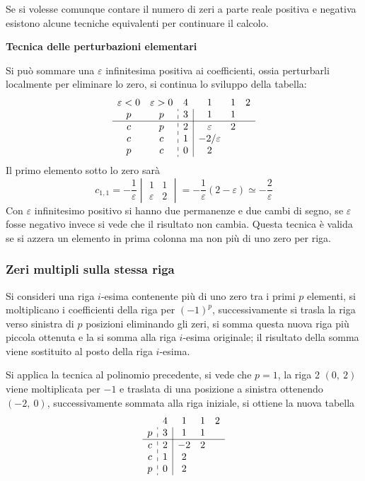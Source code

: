 Se si volesse comunque contare il numero di zeri a parte reale positiva e
negativa esistono alcune tecniche equivalenti per continuare il calcolo.

\textbf{Tecnica delle perturbazioni elementari}

Si può sommare una $\varepsilon$ infinitesima positiva ai coefficienti, ossia
perturbarli localmente per eliminare lo zero, si continua lo sviluppo della
tabella:
$$
\begin{array}{cc:c|cccc}
\varepsilon<0 & \varepsilon>0  & 4 & 1 & 1 & 2 \\
p & p & 3 & 1 & 1 \\ \hline
c & p & 2 & \varepsilon & 2  \\
c & c & 1 & -2/\varepsilon\\
p & c & 0 & 2
\end{array}
$$
Il primo elemento sotto lo zero sarà
$$
c_{1,1} = -\frac{1}{\varepsilon}\begin{vmatrix}
1 & 1 \\
\varepsilon & 2
\end{vmatrix} = -\frac{1}{\varepsilon}(2-\varepsilon) \simeq
-\frac{2}{\varepsilon}
$$
Con $\varepsilon$ infinitesimo positivo si hanno due permanenze e due cambi di
segno, se $\varepsilon$ fosse negativo invece si vede che il risultato non
cambia.
Questa tecnica è valida se si azzera un elemento in prima colonna ma non
più di uno zero per riga.

\newpage
\subsubsection{Zeri multipli sulla stessa riga}
Si consideri una riga $i$-esima contenente più di uno zero tra i primi $p$
elementi, si moltiplicano i coefficienti della riga per $(-1)^p$,
successivamente si trasla la riga verso sinistra di $p$ posizioni eliminando
gli zeri, si somma questa nuova riga più piccola ottenuta e la si somma alla
riga $i$-esima originale; il risultato della somma viene sostituito al posto
della riga $i$-esima.


Si applica la tecnica al polinomio precedente, si vede che $p=1$, la riga 2
$(0,\ 2)$ viene moltiplicata per $-1$ e traslata di una posizione a sinistra
ottenendo $(-2,\ 0)$, successivamente sommata alla riga iniziale, si ottiene la
nuova tabella
$$
\begin{array}{c:c|cccc}
   & 4 & 1 & 1 & 2 \\
 p & 3 & 1 & 1 \\ \hline
 c & 2 & -2 & 2  \\
 c & 1 & 2 \\
 p & 0 & 2
\end{array}
$$

